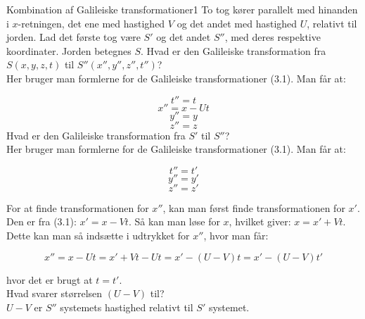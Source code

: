 \documentclass[crop=false, class=memoir]{standalone}
\begin{document}
\begin{opgave}{Kombination af Galileiske transformationer}{1}	
	To tog kører parallelt med hinanden i $x$-retningen, det ene med hastighed $V$ og det andet med hastighed $U$,
	relativt til jorden. Lad det første tog være $S'$ og det andet $S''$, med deres respektive koordinater. Jorden betegnes $S$.
	\opg Hvad er den Galileiske transformation fra $S \left( x,y,z,t \right)$ til $S'' \left( x'',y'',z'',t'' \right)$?\\
	
	Her bruger man formlerne for de Galileiske transformationer (3.1). Man får at:
	
	$$t''=t$$
	$$x''=x-Ut$$
	$$y''=y$$
	$$z''=z$$
	\opg Hvad er den Galileiske transformation fra $S'$ til $S''$?\\

	Her bruger man formlerne for de Galileiske transformationer (3.1). Man får at:
	
	$$t''=t'$$
	$$y''=y'$$
	$$z''=z'$$
	
	For at finde transformationen for $x''$, kan man først finde transformationen for $x'$. Den er fra (3.1): $x' = x - Vt $. Så kan man løse for $x$, hvilket giver: $x = x' + Vt$. Dette kan man så indsætte i udtrykket for $x''$, hvor man får:
	
	$$x'' = x-Ut = x' + Vt -Ut = x' - \left( U - V \right)t = x' - \left( U-V \right)t'$$
	
	hvor det er brugt at $t=t'$.\\
	\opg Hvad svarer størrelsen $\left( U- V \right)$ til?\\
	

	$U-V$ er $S''$ systemets hastighed relativt til $S'$ systemet.	 
\end{opgave}
\end{document}
